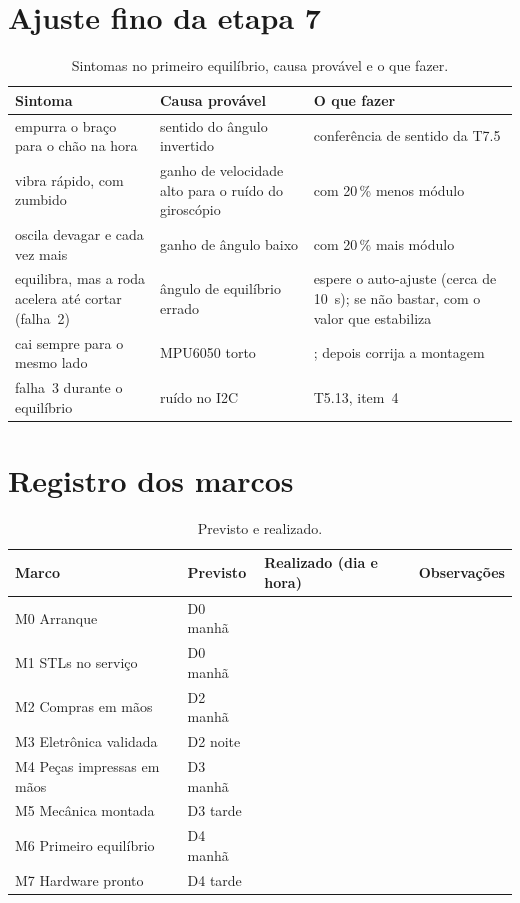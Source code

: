 \documentclass[11pt,a4paper]{article}
\newcommand{\cmd}[1]{\texttt{\detokenize{#1}}}   %
\begin{document}
\section{Ajuste fino da etapa 7}
\label{ap:sintomas}

\begin{table}[H]
\centering\small
\caption{Sintomas no primeiro equilíbrio, causa provável e o que fazer.}
\label{tab:sintomas}
\begin{tabularx}{\textwidth}{@{}>{\raggedright\arraybackslash}p{4.6cm}>{\raggedright\arraybackslash}p{4.2cm}>{\raggedright\arraybackslash}X@{}}
\toprule
Sintoma & Causa provável & O que fazer \\
\midrule
empurra o braço para o chão na hora & sentido do ângulo invertido & conferência de sentido
  da T7.5 \\
vibra rápido, com zumbido & ganho de velocidade alto para o ruído do giroscópio &
  \cmd{k2} com 20\,\% menos módulo \\
oscila devagar e cada vez mais & ganho de ângulo baixo & \cmd{k1} com 20\,\% mais módulo \\
equilibra, mas a roda acelera até cortar (falha~2) & ângulo de equilíbrio errado & espere o
  auto-ajuste (cerca de 10~s); se não bastar, \cmd{trim} com o valor que estabiliza \\
cai sempre para o mesmo lado & MPU6050 torto & \cmd{trim <graus>}; depois corrija a
  montagem \\
falha~3 durante o equilíbrio & ruído no I2C & T5.13, item~4 \\
\bottomrule
\end{tabularx}
\end{table}

\section{Registro dos marcos}
\label{ap:registro}

\begin{table}[H]
\centering\small
\caption{Previsto e realizado.}
\label{tab:registro}
\begin{tabularx}{\textwidth}{@{}ll>{\raggedright\arraybackslash}p{3.4cm}X@{}}
\toprule
Marco & Previsto & Realizado (dia e hora) & Observações \\
\midrule
M0 Arranque & D0 manhã & & \\[6pt]
M1 STLs no serviço & D0 manhã & & \\[6pt]
M2 Compras em mãos & D2 manhã & & \\[6pt]
M3 Eletrônica validada & D2 noite & & \\[6pt]
M4 Peças impressas em mãos & D3 manhã & & \\[6pt]
M5 Mecânica montada & D3 tarde & & \\[6pt]
M6 Primeiro equilíbrio & D4 manhã & & \\[6pt]
M7 Hardware pronto & D4 tarde & & \\[6pt]
\bottomrule
\end{tabularx}
\end{table}
\end{document}
